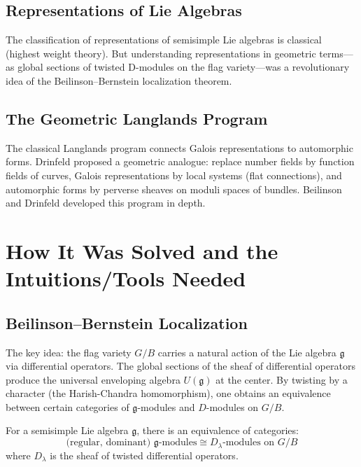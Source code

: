 \subsection{Representations of Lie Algebras}

The classification of representations of semisimple Lie algebras is classical (highest weight theory). But understanding representations in geometric terms---as global sections of twisted D-modules on the flag variety---was a revolutionary idea of the Beilinson--Bernstein localization theorem.

\subsection{The Geometric Langlands Program}

The classical Langlands program connects Galois representations to automorphic forms. Drinfeld proposed a geometric analogue: replace number fields by function fields of curves, Galois representations by local systems (flat connections), and automorphic forms by perverse sheaves on moduli spaces of bundles. Beilinson and Drinfeld developed this program in depth.

\section{How It Was Solved and the Intuitions/Tools Needed}

\subsection{Beilinson--Bernstein Localization}

The key idea: the flag variety $G/B$ carries a natural action of the Lie algebra $\mathfrak{g}$ via differential operators. The global sections of the sheaf of differential operators produce the universal enveloping algebra $U(\mathfrak{g})$ at the center. By twisting by a character (the Harish-Chandra homomorphism), one obtains an equivalence between certain categories of $\mathfrak{g}$-modules and $D$-modules on $G/B$.

\begin{theorem}
For a semisimple Lie algebra $\mathfrak{g}$, there is an equivalence of categories:
\[
\text{(regular, dominant) }\mathfrak{g}\text{-modules} \cong D_\lambda\text{-modules on } G/B
\]
where $D_\lambda$ is the sheaf of twisted differential operators.
\end{theorem}

